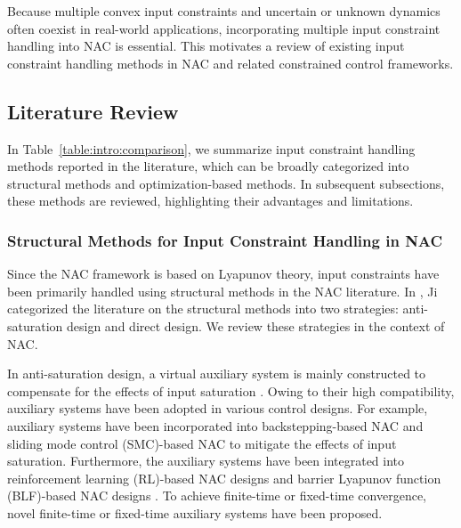 \documentclass[letterpaper, journal]{IEEEtran}
\begin{document}
Because multiple convex input constraints and uncertain or unknown dynamics often coexist in real-world applications, incorporating multiple input constraint handling into NAC is essential.
This motivates a review of existing input constraint handling methods in NAC and related constrained control frameworks.

\subsection{Literature Review}


In Table~\ref{table:intro:comparison}, we summarize input constraint handling methods reported in the literature, which can be broadly categorized into structural methods and optimization-based methods.
In subsequent subsections, these methods are reviewed, highlighting their advantages and limitations.

\subsubsection{Structural Methods for Input Constraint Handling in NAC}

Since the NAC framework is based on Lyapunov theory, input constraints have been primarily handled using structural methods in the NAC literature.
In \cite{Ji:2025aa}, Ji \etal categorized the literature on the structural methods into two strategies: anti-saturation design and direct design.
We review these strategies in the context of NAC.

In anti-saturation design, a virtual auxiliary system is mainly constructed to compensate for the effects of input saturation \cite{Ma:2025aa,Gao:2026aa,Yang:2021aa,Jia:2020aa,Liu:2024aa,Liu:2025aa,Gao:2017aa,Esfandiari:2014aa,Esfandiari:2015aa,Yu:2022aa,Rezaei:2025aa,He:2016aa,He:2019aa,Zhao:2016aa,Peng:2020aa}.
Owing to their high compatibility, auxiliary systems have been adopted in various control designs.
For example, auxiliary systems have been incorporated into backstepping-based NAC \cite{Gao:2017aa} and sliding mode control (SMC)-based NAC \cite{Ma:2025aa} to mitigate the effects of input saturation.
Furthermore, the auxiliary systems have been integrated into reinforcement learning (RL)-based NAC designs \cite{Gao:2026aa} and barrier Lyapunov function (BLF)-based NAC designs \cite{Yang:2021aa}.
To achieve finite-time or fixed-time convergence, novel finite-time \cite{Jia:2020aa} or fixed-time \cite{Liu:2024aa,Liu:2025aa} auxiliary systems have been proposed.
\end{document}
